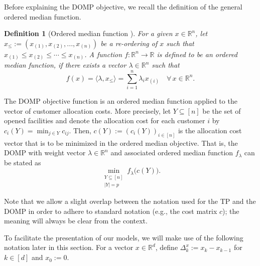 \documentclass[letterpaper]{article}
\newtheorem{definition}[theorem]{Definition}
\begin{document}
Before explaining the DOMP objective, we  recall the definition of the general ordered median function.
\begin{definition}[Ordered median function {\citep{nickel_puerto_2005}}]
    For a given $x \in \mathbb{R}^n$, let $x_\leq := (x_{(1)}, x_{(2)}, ..., x_{(n)})$ be a re-ordering of $x$ such that $x_{(1)} \leq x_{(2)} \leq \cdots \leq x_{(n)}$.
    A function $f: \mathbb{R}^n \rightarrow \mathbb{R}$ is defined to be an ordered median function, if there exists a vector $\lambda \in \mathbb{R}^n$ such that 
    \[f(x) = \langle \lambda, x_\leq \rangle = \sum_{i = 1}^n \lambda_i x_{(i)} \quad \forall \, x \in \mathbb{R}^n.\]
\end{definition}
The DOMP objective function is an ordered median function applied to the vector of customer allocation costs. More precisely, let $Y \subseteq [n]$ be the set of opened facilities and denote the allocation cost for each customer $i$ by $c_i(Y) = \min_{j \in Y} c_{ij}$. Then, $c(Y) := \left(c_i(Y)\right)_{i \in [n]}$ is the allocation cost vector that is to be minimized in the ordered median objective. That is, the DOMP with weight vector $\lambda \in \mathbb{R}^n$ and associated ordered median function $f_\lambda$ can be stated as
\begin{equation}\label{DOMP_definition}
    \min_{\substack{Y \subseteq [n] \\ |Y| = p}} f_\lambda\big(c(Y)\big).
\end{equation}

Note that we allow a slight overlap between the notation used for the TP and the DOMP in order to adhere to standard notation (e.g., the cost matrix $c$); the meaning will always be clear from the context.

To facilitate the presentation of our models, we will make use of the following notation later in this section. For a vector $x \in \mathbb{R}^d$, define $\Delta_k^{x} := x_k - x_{k-1}$ for $k \in [d]$ and $x_0 := 0$.
\end{document}
